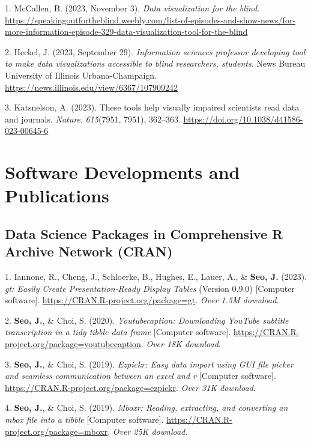 \documentclass[11pt,a4paper,]{awesome-cv}
\newlength{\cslhangindent}
\newenvironment{CSLReferences}[2] %
 {\begin{list}{}{%
  \setlength{\itemindent}{0pt}
  \setlength{\leftmargin}{0pt}
  \setlength{\parsep}{0pt}
  \ifodd #1
   \setlength{\leftmargin}{\cslhangindent}
   \setlength{\itemindent}{-1\cslhangindent}
  \fi
  \setlength{\itemsep}{#2\baselineskip}}}
 {\end{list}}
\begin{document}
\label{refs-37f5ad1f1850196509ec80c98fd22097}
\begin{CSLReferences}{1}{0}
1. McCallen, B. (2023, November 3). \emph{Data visualization for the
blind}.
\url{https://speakingoutfortheblind.weebly.com/list-of-episodes-and-show-news/for-more-information-episode-329-data-visualization-tool-for-the-blind}

2. Heckel, J. (2023, September 29). \emph{Information sciences professor
developing tool to make data visualizations accessible to blind
researchers, students}. News Bureau University of Illinois
Urbana-Champaign. \url{https://news.illinois.edu/view/6367/107909242}

3. Katsnelson, A. (2023). These tools help visually impaired scientists
read data and journals. \emph{Nature}, \emph{615}(7951, 7951), 362--363.
\url{https://doi.org/10.1038/d41586-023-00645-6}

\end{CSLReferences}

\section{Software Developments and
Publications}\label{software-developments-and-publications}

\subsection{Data Science Packages in Comprehensive R Archive Network
(CRAN)}\label{data-science-packages-in-comprehensive-r-archive-network-cran}

\label{refs-e4f6fe834f2d1b4cdb55cfea3d65ab90}
\begin{CSLReferences}{1}{0}
1. Iannone, R., Cheng, J., Schloerke, B., Hughes, E., Lauer, A., \&
\textbf{Seo, J.} (2023). \emph{gt: Easily Create Presentation-Ready
Display Tables} (Version 0.9.0) {[}Computer software{]}.
\url{https://CRAN.R-project.org/package=gt}. \emph{Over 1.5M download}.

2. \textbf{Seo, J.}, \& Choi, S. (2020). \emph{Youtubecaption:
Downloading YouTube subtitle transcription in a tidy tibble data frame}
{[}Computer software{]}.
\url{https://CRAN.R-project.org/package=youtubecaption}. \emph{Over 18K
download}.

3. \textbf{Seo, J.}, \& Choi, S. (2019). \emph{Ezpickr: Easy data import
using GUI file picker and seamless communication between an excel and r}
{[}Computer software{]}.
\url{https://CRAN.R-project.org/package=ezpickr}. \emph{Over 31K
download}.

4. \textbf{Seo, J.}, \& Choi, S. (2019). \emph{Mboxr: Reading,
extracting, and converting an mbox file into a tibble} {[}Computer
software{]}. \url{https://CRAN.R-project.org/package=mboxr}. \emph{Over
25K download}.

\end{CSLReferences}
\end{document}
